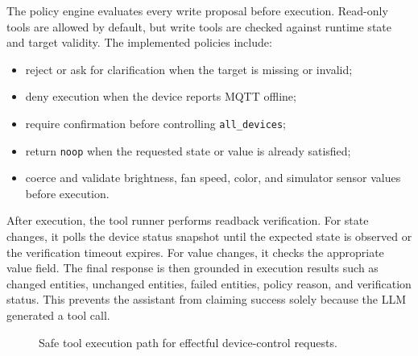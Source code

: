 The policy engine evaluates every write proposal before execution. Read-only tools are allowed by default, but write tools are checked against runtime state and target validity. The implemented policies include:

\begin{itemize}[leftmargin=*, itemsep=2pt]
    \item reject or ask for clarification when the target is missing or invalid;
    \item deny execution when the device reports MQTT offline;
    \item require confirmation before controlling \texttt{all\_devices};
    \item return \texttt{noop} when the requested state or value is already satisfied;
    \item coerce and validate brightness, fan speed, color, and simulator sensor values before execution.
\end{itemize}

After execution, the tool runner performs readback verification. For state changes, it polls the device status snapshot until the expected state is observed or the verification timeout expires. For value changes, it checks the appropriate value field. The final response is then grounded in execution results such as changed entities, unchanged entities, failed entities, policy reason, and verification status. This prevents the assistant from claiming success solely because the LLM generated a tool call.

\begin{figure}[H]
    \centering
    \caption{Safe tool execution path for effectful device-control requests.}
    \label{fig:hera-safe-tool-path}
\end{figure}

